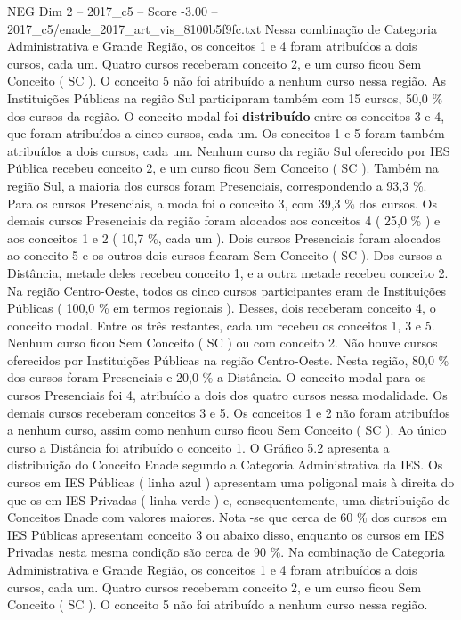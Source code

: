 \begin{textsample}{NEG Dim 2 – 2017\_c5 – Score -3.00 – 2017\_c5/enade\_2017\_art\_vis\_8100b5f9fc.txt}
Nessa combinação de Categoria Administrativa e Grande Região, os conceitos 1 e 4 foram atribuídos a dois cursos, cada um.
Quatro cursos receberam conceito 2, e um curso ficou Sem Conceito ( SC ).
O conceito 5 não foi atribuído a nenhum curso nessa região.
As Instituições Públicas na região Sul participaram também com 15 cursos, 50,0 \% dos cursos da região.
O conceito modal foi \textbf{distribuído} entre os conceitos 3 e 4, que foram atribuídos a cinco cursos, cada um.
Os conceitos 1 e 5 foram também atribuídos a dois cursos, cada um.
Nenhum curso da região Sul oferecido por IES Pública recebeu conceito 2, e um curso ficou Sem Conceito ( SC ).
Também na região Sul, a maioria dos cursos foram Presenciais, correspondendo a 93,3 \%.
Para os cursos Presenciais, a moda foi o conceito 3, com 39,3 \% dos cursos.
Os demais cursos Presenciais da região foram alocados aos conceitos 4 ( 25,0 \% ) e aos conceitos 1 e 2 ( 10,7 \%, cada um ).
Dois cursos Presenciais foram alocados ao conceito 5 e os outros dois cursos ficaram Sem Conceito ( SC ).
Dos cursos a Distância, metade deles recebeu conceito 1, e a outra metade recebeu conceito 2.
Na região Centro-Oeste, todos os cinco cursos participantes eram de Instituições Públicas ( 100,0 \% em termos regionais ).
Desses, dois receberam conceito 4, o conceito modal.
Entre os três restantes, cada um recebeu os conceitos 1, 3 e 5.
Nenhum curso ficou Sem Conceito ( SC ) ou com conceito 2.
Não houve cursos oferecidos por Instituições Públicas na região Centro-Oeste.
Nesta região, 80,0 \% dos cursos foram Presenciais e 20,0 \% a Distância.
O conceito modal para os cursos Presenciais foi 4, atribuído a dois dos quatro cursos nessa modalidade.
Os demais cursos receberam conceitos 3 e 5.
Os conceitos 1 e 2 não foram atribuídos a nenhum curso, assim como nenhum curso ficou Sem Conceito ( SC ).
Ao único curso a Distância foi atribuído o conceito 1.
O Gráfico 5.2 apresenta a distribuição do Conceito Enade segundo a Categoria Administrativa da IES.
Os cursos em IES Públicas ( linha azul ) apresentam uma poligonal mais à direita do que os em IES Privadas ( linha verde ) e, consequentemente, uma distribuição de Conceitos Enade com valores maiores.
Nota -se que cerca de 60 \% dos cursos em IES Públicas apresentam conceito 3 ou abaixo disso, enquanto os cursos em IES Privadas nesta mesma condição são cerca de 90 \%.
Na combinação de Categoria Administrativa e Grande Região, os conceitos 1 e 4 foram atribuídos a dois cursos, cada um.
Quatro cursos receberam conceito 2, e um curso ficou Sem Conceito ( SC ).
O conceito 5 não foi atribuído a nenhum curso nessa região.

\end{textsample}
